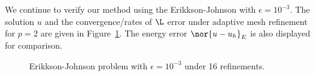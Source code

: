 We continue to verify our method using the Erikkson-Johnson with $\epsilon = 10^{-3}$.  The solution $u$ and the convergence/rates of $\L$ error under adaptive mesh refinement for $p=2$ are given in Figure~\ref{fig:erikksonAdapt}.  The energy error $\nor{u-u_h}_E$ is also displayed for comparison.  
\begin{figure}[!h]
\centering
{}
\caption{Erikkson-Johnson problem with $\epsilon = 10^{-3}$ under 16 refinements.}
\label{fig:erikksonAdapt}
\end{figure}

